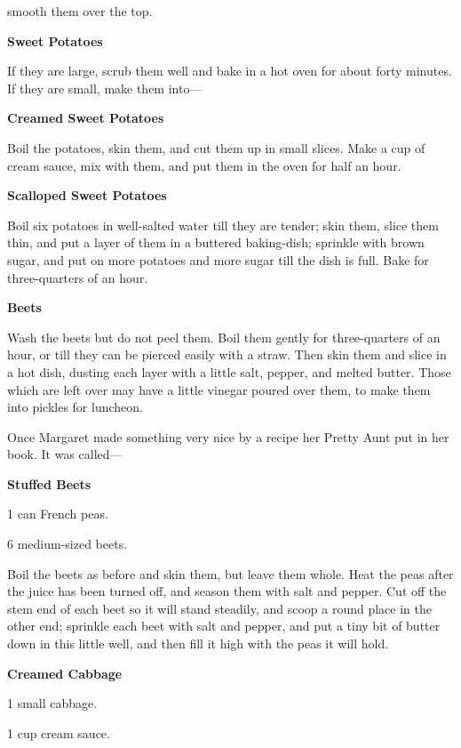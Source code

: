 \documentclass[11pt]{book}
\newcommand{\indpar}{\par\noindent\hspace*{\parindent}}
\newcommand{\ingredient}{\indpar}
\newcommand{\instruction}{\indpar}
\newenvironment{RecipeTitle}{\medskip\begin{center}\large\bf }{\end{center}\smallskip}
\begin{document}
smooth them over the top.
\begin{RecipeTitle}
Sweet Potatoes\label{sweet_potatoes}
\end{RecipeTitle}
\instruction  If they are large, scrub them well and bake in a hot
oven for about forty minutes.  If they are small, make
them into---
\begin{RecipeTitle}
Creamed Sweet Potatoes\label{creamed_sweet_potatoes}
\end{RecipeTitle}
\instruction  Boil the potatoes, skin them, and cut them up in small
slices.  Make a cup of cream sauce, mix with them, and
put them in the oven for half an hour.
\begin{RecipeTitle}
Scalloped Sweet Potatoes\label{scalloped_sweet_potatoes}
\end{RecipeTitle}
\instruction  Boil six potatoes in well-salted water till they are tender;
skin them, slice them thin, and put a layer of them in a
buttered baking-dish;  sprinkle with brown sugar, and put
on more potatoes and more sugar till the dish is full.
Bake for three-quarters of an hour.
\begin{RecipeTitle}
Beets\label{beets}
\end{RecipeTitle}
\instruction  Wash the beets but do not peel them.  Boil them gently
for three-quarters of an hour, or till they can be pierced
easily with a straw.  Then skin them and slice in a hot
dish, dusting each layer with a little salt, pepper, and
melted butter.  Those which are left over may have a little
vinegar poured over them, to make them into pickles for
luncheon.
\smallskip
\indpar
  Once Margaret made something very nice by a recipe her
Pretty Aunt put in her book.  It was called---
\begin{RecipeTitle}
                   Stuffed Beets\label{stuffed_beets}
\end{RecipeTitle}
\ingredient  1 can French peas.
\ingredient  6 medium-sized beets.
\instruction  Boil the beets as before and skin them, but leave them
whole.  Heat the peas after the juice has been turned off,
and season them with salt and pepper.  Cut off the stem
end of each beet so it will stand steadily, and scoop
a round place in the other end; sprinkle each beet with
salt and pepper, and put a tiny bit of butter down in
this little well, and then fill it high with the peas
it will hold.
\begin{RecipeTitle}
                  Creamed Cabbage\label{creamed_cabbage}
\end{RecipeTitle}
\ingredient  1 small cabbage.
\ingredient  1 cup cream sauce.
\end{document}
